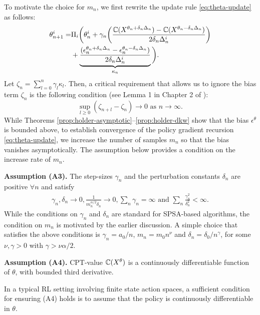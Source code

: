 To motivate the choice for $m_n$, we first rewrite the update rule \eqref{eq:theta-update} as follows:
\begin{align*}
\theta^{i}_{n+1}  = & \Pi_{i}\bigg( \theta^{i}_n +  \gamma_n \bigg( \frac{\mathbb{C}(X^{\theta_n +\delta_n\Delta_n}) - \mathbb{C}(X^{\theta_n-\delta_n\Delta_n})}{2\delta_n\Delta_n^{i}}\bigg) \\
&+ \underbrace{\frac{(\epsilon_n^{\theta_n +\delta_n\Delta_n} - \epsilon_n^{\theta_n-\delta_n\Delta_n})}{2\delta_n\Delta_n^{i}}}_{\kappa_n}\bigg).
\end{align*}
Let $\zeta_n = \sum_{l = 0}^{n} \gamma_l \kappa_{l}$. Then, a critical requirement that allows us to ignore the bias term $\zeta_n$ is the following condition (see Lemma 1 in Chapter 2 of \cite{borkar2008stochastic}): 
$$\sup_{l\ge0} \left (\zeta_{n+l} - \zeta_n \right) \rightarrow 0 \text{ as } n\rightarrow\infty.$$ 
While Theorems \ref{prop:holder-asymptotic}--\ref{prop:holder-dkw} show that the bias $\epsilon^\theta$ is bounded above, to establish convergence of the policy gradient recursion \eqref{eq:theta-update}, we increase the number of samples $m_n$ so that the bias vanishes asymptotically.  The assumption below provides a condition on the increase rate of $m_n$.

\noindent\textbf{Assumption (A3).}  The step-sizes $\gamma_n$ and the perturbation constants 
$\delta_n$ are positive $\forall n$ and satisfy
\begin{align*}
\gamma_n, \delta_n \rightarrow 0, \frac{1}{m_n^{\alpha/2}\delta_n}\rightarrow 0,  \sum_n \gamma_n=\infty \text{ and } \sum_n \frac{\gamma_n^2}{\delta_n^2}<\infty. 
\end{align*}
While the conditions on $\gamma_n$ and $\delta_n$ are standard for SPSA-based algorithms, the condition on $m_n$ is motivated by the earlier discussion. 
A simple choice that satisfies the above conditions is $\gamma_n = a_0/n$, $m_n = m_0 n^\nu$ and $\delta_n = \delta_0/{n^\gamma}$, for some $\nu, \gamma >0$ with $\gamma > \nu\alpha/2$.

\noindent\textbf{Assumption (A4).}  CPT-value $\mathbb{C}(X^\theta)$ is a continuously differentiable function of $\theta$, with bounded third derivative.

In a typical RL setting involving finite state action spaces, a sufficient condition for ensuring (A4) holds is to assume that the policy is continuously differentiable in $\theta$. 

